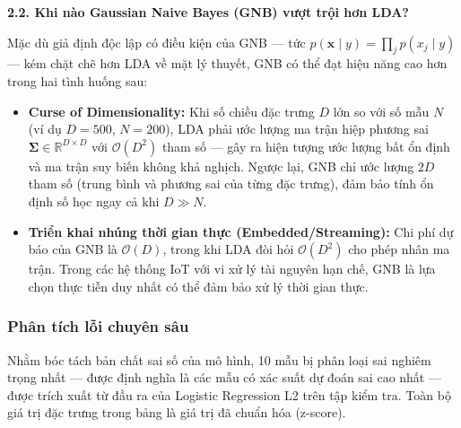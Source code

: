 \noindent\textcolor{infocolor}{\textbf{2.2. Khi nào Gaussian Naive Bayes (GNB) vượt trội 
hơn LDA?}}

Mặc dù giả định độc lập có điều kiện của 
GNB --- tức $p(\boldsymbol{x} \mid y) = \prod_{j} p(x_j \mid y)$ --- 
kém chặt chẽ hơn LDA về mặt lý thuyết, GNB có thể đạt hiệu năng 
cao hơn trong hai tình huống sau:

\begin{itemize}
    \item \textbf{Curse of Dimensionality:} 
    Khi số chiều đặc trưng $D$ lớn so với số mẫu $N$ 
    (ví dụ $D = 500$, $N = 200$), LDA phải ước lượng ma trận 
    hiệp phương sai $\boldsymbol{\Sigma} \in \mathbb{R}^{D \times D}$ 
    với $\mathcal{O}(D^2)$ tham số --- gây ra hiện tượng ước lượng 
    bất ổn định và ma trận suy biến không khả nghịch. Ngược lại, 
    GNB chỉ ước lượng $2D$ tham số (trung bình và phương sai của 
    từng đặc trưng), đảm bảo tính ổn định số học ngay cả khi 
    $D \gg N$.

    \item \textbf{Triển khai nhúng thời gian thực (Embedded/Streaming):} 
    Chi phí dự báo của GNB là $\mathcal{O}(D)$, trong khi LDA đòi 
    hỏi $\mathcal{O}(D^2)$ cho phép nhân ma trận. Trong các hệ 
    thống IoT với vi xử lý tài nguyên hạn chế, GNB là lựa chọn 
    thực tiễn duy nhất có thể đảm bảo xử lý thời gian thực.
\end{itemize}

\subsubsection{Phân tích lỗi chuyên sâu}
\label{sec:error_analysis}

Nhằm bóc tách bản chất sai số của mô hình, 10 mẫu bị phân loại sai 
nghiêm trọng nhất --- được định nghĩa là các mẫu có xác suất dự đoán 
sai cao nhất --- được trích xuất từ đầu ra của Logistic Regression L2 
trên tập kiểm tra. Toàn bộ giá trị đặc trưng trong bảng là giá trị 
đã chuẩn hóa (z-score).

